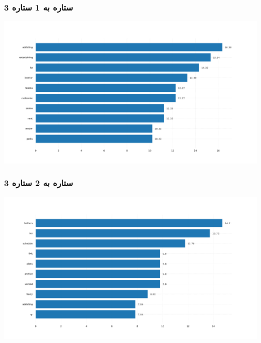 \subsubsection{\Large 3 ستاره به 1 ستاره}
            { \selectfont \setLR
            \begin{center}
            \includegraphics[scale=0.4]{Images/rel_norm_freq_3_1.png}
            \end{center}
            \begin{adjustbox}{width=\textwidth}
            \end{adjustbox}
            }
\subsubsection{\Large 3 ستاره به 2 ستاره}
            { \selectfont \setLR
            \begin{center}
            \includegraphics[scale=0.4]{Images/rel_norm_freq_3_2.png}
            \end{center}
            \begin{adjustbox}{width=\textwidth}
            \end{adjustbox}
            }

